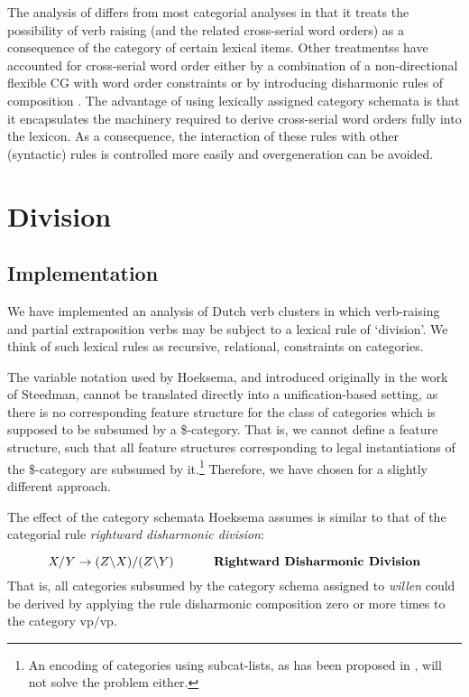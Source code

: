 The analysis of  differs from most categorial analyses in
that it treats the possibility of verb raising (and the related cross-serial 
word
orders) as a consequence of the category of certain lexical items.  Other
treatmentss have accounted for cross-serial word order either by a combination 
of
a non-directional flexible CG with word order constraints
\cite{Houtman84,Steedman85} or by introducing disharmonic rules of composition
\cite{Cremers-diss}.  The advantage of using lexically assigned category 
schemata
is that it encapsulates the machinery required to derive cross-serial word 
orders
fully into the lexicon.  As a consequence, the interaction of these rules with
other (syntactic) rules is controlled more easily and overgeneration can be
avoided.

\section{Division}

\subsection{Implementation}
We have implemented an analysis of Dutch verb clusters in which verb-raising 
and partial extraposition verbs may be subject to a lexical rule of `division'.
We think of such lexical rules as recursive, relational, constraints on  
categories. 

The variable notation used by Hoeksema, and introduced originally in the work of
Steedman, cannot be translated directly into a unification-based setting, as 
there
is no corresponding feature structure for the class of categories which is
supposed to be subsumed by a \$-category.  That is, we cannot define a feature
structure, such that all feature structures corresponding to legal 
instantiations
of the \$-category are subsumed by it.\footnote{ An encoding of categories using
{\sc subcat}-lists, as has been proposed in , will 
not
solve the problem either.}  Therefore, we have chosen for a slightly different
approach.

The effect of the category schemata Hoeksema assumes is similar to that of the 
categorial rule {\em rightward disharmonic division}:

\begin{equation}
X/Y \rightarrow (Z\backslash X)/(Z\backslash Y) \mbox{\hspace{1cm} \bf Rightward 
Disharmonic Division}
\end{equation}
That is, all categories subsumed by the category schema assigned to {\em willen} 
could be derived by applying the rule disharmonic composition zero or more times 
to the category {\sc vp$/$vp}. 

